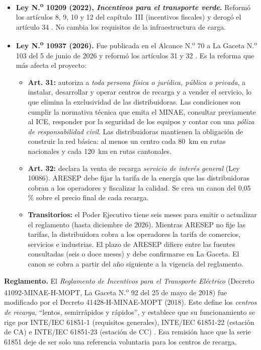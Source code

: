 \begin{itemize}
\item \textbf{Ley N.\textsuperscript{o} 10209 (2022), \emph{Incentivos para el transporte verde}.} Reformó los artículos 8, 9, 10 y 12 del capítulo~III (incentivos fiscales) y derogó el artículo 34 \cite{ley10209}. No cambia los requisitos de la infraestructura de carga.
\item \textbf{Ley N.\textsuperscript{o} 10937 (2026).} Fue publicada en el Alcance N.\textsuperscript{o} 70 a La Gaceta N.\textsuperscript{o} 103 del 5 de junio de 2026 y reformó los artículos 31 y 32 \cite{larepublica10937,bufete10937}. Es la reforma que más afecta el proyecto:
  \begin{itemize}
  \item \textbf{Art. 31:} autoriza a \emph{toda persona física o jurídica, pública o privada}, a instalar, desarrollar y operar centros de recarga y a vender el servicio, lo que elimina la exclusividad de las distribuidoras. Las condiciones son cumplir la normativa técnica que emita el MINAE, consultar previamente al ICE, responder por la seguridad de los equipos y contar con una \emph{póliza de responsabilidad civil}. Las distribuidoras mantienen la obligación de construir la red básica: al menos un centro cada 80~km en rutas nacionales y cada 120~km en rutas cantonales.
  \item \textbf{Art. 32:} declara la venta de recarga \emph{servicio de interés general} (Ley 10086). ARESEP debe fijar la tarifa de la energía que las distribuidoras cobran a los operadores y fiscalizar la calidad. Se crea un canon del 0,05\,\% sobre el precio final de cada recarga.
  \item \textbf{Transitorios:} el Poder Ejecutivo tiene seis meses para emitir o actualizar el reglamento (hasta diciembre de 2026). Mientras ARESEP no fije las tarifas, la distribuidora cobra a los operadores la tarifa de comercios, servicios e industrias. El plazo de ARESEP difiere entre las fuentes consultadas (seis o doce meses) y debe confirmarse en La Gaceta. El canon se cobra a partir del año siguiente a la vigencia del reglamento.
  \end{itemize}
\end{itemize}

\textbf{Reglamento.} El \emph{Reglamento de Incentivos para el Transporte Eléctrico} (Decreto 41092-MINAE-H-MOPT, La Gaceta N.\textsuperscript{o} 92 del 25 de mayo de 2018) fue modificado por el Decreto 41428-H-MINAE-MOPT (2018). Este define los \emph{centros de recarga}, ``lentos, semirrápidos y rápidos'', y establece que su funcionamiento se rige por INTE/IEC 61851-1 (requisitos generales), INTE/IEC 61851-22 (estación de CA) e INTE/IEC 61851-23 (estación de CC) \cite{dec41428}. Esa remisión hace que la serie 61851 deje de ser solo una referencia voluntaria para los centros de recarga.

